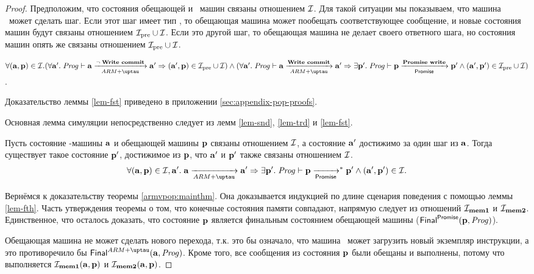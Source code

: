 \begin{proof}
Предположим, что состояния обещающей и \ARMt~машин связаны отношением $\mathcal{I}$.
Для такой ситуации мы показываем, что машина \ARMt~может сделать шаг.
Если этот шаг имеет тип , то обещающая машина
может пообещать соответствующее сообщение, и новые состояния машин будут
связаны отношением $\mathcal{I}_{\textup{\rm pre}} \cup \mathcal{I}$.
Если это другой шаг, то обещающая машина не делает своего ответного шага,
но состояния машин опять же связаны отношением $\mathcal{I}_{\textup{\rm pre}} \cup \mathcal{I}$.
\begin{lemma}
\label{lem-fst}
$\forall (\aT, \p) \in \simrel. \\
(\forall \aT'. \; \Cfprom \vdash \aT \armStepgen{\lnot \; \transenv{Write commit}} \aT' \Rightarrow (\aT', \p) \in \simrelPre \cup \simrel) \land {} \\
(\forall \aT'. \; \Cfprom \vdash \aT \armStepgen{\transenv{Write commit}} \aT' \Rightarrow
\exists \p'. \; \Cfprom \vdash \p \promStepgen{\transenv{Promise write}} \p' \land  (\aT', \p') \in \simrelPre \cup \simrel)$.
\end{lemma}
\noindent
Доказательство леммы \ref{lem-fst} приведено в приложении \ref{sec:appendix-pop-proofs}.

Основная лемма симуляции непосредственно следует из лемм  \ref{lem-snd}, \ref{lem-trd} и \ref{lem-fst}.
\begin{lemma}
  \label{lem-fth}
  Пусть состояние \ARMt-машины $\mathbf{a}$ и обещающей машины $\mathbf{p}$ связаны отношением $\mathcal{I}$,
  а состояние $\mathbf{a}'$ достижимо за один шаг из $\mathbf{a}$. Тогда существует такое состояние $\mathbf{p}'$,
  достижимое из $\mathbf{p}$, что $\mathbf{a}'$ и $\mathbf{p}'$ также связаны отношением $\mathcal{I}$.
\[\forall (\aT, \p) \in \simrel, \aT'. \; \aT \armStep \aT' \Rightarrow
\exists \p'. \; \Cfprom \vdash \p \promStep^{*} \p' \land (\aT', \p') \in \simrel.\]
\end{lemma}


Вернёмся к доказательству теоремы \ref{armvpop:mainthm}.
Она доказывается индукцией по длине сценария поведения с помощью леммы \ref{lem-fth}.
Часть утверждения теоремы о том, что конечные состояния памяти совпадают,
напрямую следует из отношений $\mathcal{I}_{\rm \bf mem1}$ и $\mathcal{I}_{\rm \bf mem2}$.
Единственное, что осталось доказать, что состояние $\mathbf{p}$ является
финальным состоянием обещающей машины ($\mathsf{Final}^{\mathsf{Promise}}(\mathbf{p}, \mathit{Prog})$).

Обещающая машина не может сделать нового перехода, т.к. это бы означало, что
машина \ARMt~может загрузить новый экземпляр инструкции, а это противоречило бы 
$\finalStateA(\aT, \Cfarm)$. Кроме того, все сообщения из состояния $\mathbf{p}$
были обещаны и выполнены, потому что выполняется
$\mathcal{I}_{\rm \bf mem1}(\mathbf{a},\mathbf{p})$ и $\mathcal{I}_{\rm \bf mem2}(\mathbf{a}, \mathbf{p})$.
\end{proof}

